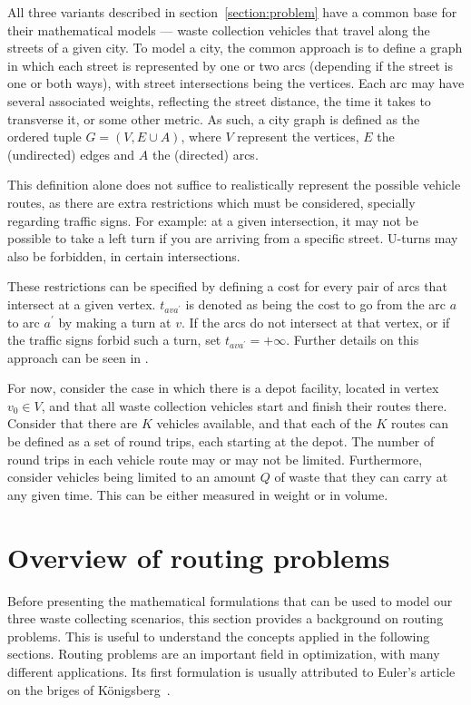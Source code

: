 All three variants described in section~\ref{section:problem} have a common
base for their mathematical models --- waste collection vehicles that travel
along the streets of a given city. To model a city, the common approach is to
define a graph in which each street is represented by one or two arcs
(depending if the street is one or both ways), with street intersections being
the vertices. Each arc may have several associated weights, reflecting the
street distance, the time it takes to transverse it, or some other metric. As
such, a city graph is defined as the ordered tuple $G = (V, E \cup A)$, where
$V$ represent the vertices, $E$ the (undirected) edges and $A$ the (directed)
arcs.

This definition alone does not suffice to realistically represent the possible
vehicle routes, as there are extra restrictions which must be considered,
specially regarding traffic signs. For example: at a given intersection, it may
not be possible to take a left turn if you are arriving from a specific street.
U-turns may also be forbidden, in certain intersections. 

These restrictions can be specified by defining a cost for every pair of arcs
that intersect at a given vertex. $t_{ava^\prime}$ is denoted as being the
cost to go from the arc $a$ to arc $a^\prime$ by making a turn at $v$. If the
arcs do not intersect at that vertex, or if the traffic signs forbid such a
turn, set $t_{ava^\prime} = +\infty$. Further details on this approach can
be seen in \citet{Corberan2002887}.

For now, consider the case in which there is a depot facility, located in
vertex $v_0 \in V$, and that all waste collection vehicles start and finish
their routes there. Consider that there are $K$ vehicles available, and that
each of the $K$ routes can be defined as a set of round trips, each starting at
the depot. The number of round trips in each vehicle route may or may not be
limited. Furthermore, consider vehicles being limited to an amount $Q$ of
waste that they can carry at any given time. This can be either measured in
weight or in volume.


\section{Overview of routing problems}
\label{section:over-rp}

Before presenting the mathematical formulations that can be used to model our
three waste collecting scenarios, this section provides a background on routing
problems. This is useful to understand the concepts applied in the following
sections. Routing problems are an important field in optimization, with many
different applications. Its first formulation is usually attributed to Euler's
article on the briges of Königsberg~\citet{Euler1736}.

